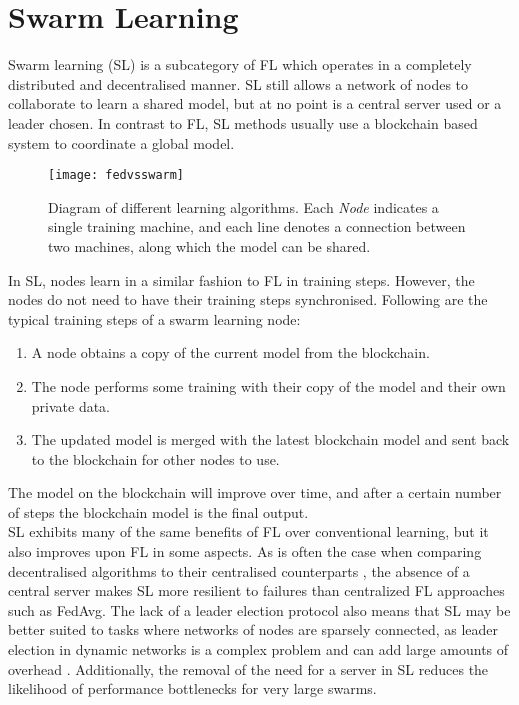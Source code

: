 \section{Swarm Learning}
Swarm learning (SL) \cite{swarm_learning} is a subcategory of FL which operates in a completely distributed and decentralised manner. SL still allows a network of nodes to collaborate to learn a shared model, but at no point is a central server used or a leader chosen. In contrast to FL, SL methods usually use a blockchain based system to coordinate a global model.

\begin{figure}[h]
	\texttt{[image: fedvsswarm]}
	\caption{Diagram of different learning algorithms. Each \emph{Node} indicates a single training machine, and each line denotes a connection between two machines, along which the model can be shared.} \label{fig_learning}
\end{figure}


In SL, nodes learn in a similar fashion to FL in training steps. However, the nodes do not need to have their training steps synchronised. Following are the typical training steps of a swarm learning node:
\begin{enumerate}
	\item A node obtains a copy of the current model from the blockchain.
	\item The node performs some training with their copy of the model and their own private data.
	\item The updated model is merged with the latest blockchain model and sent back to the blockchain for other nodes to use.
\end{enumerate}
The model on the blockchain will improve over time, and after a certain number of steps the blockchain model is the final output. \\

SL exhibits many of the same benefits of FL over conventional learning, but it also improves upon FL in some aspects. As is often the case when comparing decentralised algorithms to their centralised counterparts \cite{swarm_resil}, the absence of a central server makes SL more resilient to failures than centralized FL approaches such as FedAvg. The lack of a leader election protocol also means that SL may be better suited to tasks where networks of nodes are sparsely connected, as leader election in dynamic networks is a complex problem and can add large amounts of overhead \cite{leaderelection}. Additionally, the removal of the need for a server in SL reduces the likelihood of performance bottlenecks for very large swarms.

